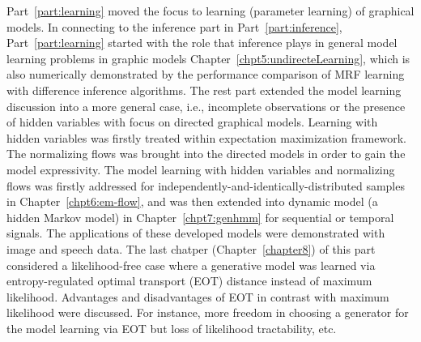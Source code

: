 Part~\ref{part:learning} moved the focus to learning (parameter learning) of graphical models. In connecting to the inference part in Part~\ref{part:inference}, Part~\ref{part:learning} started with the role that inference plays in general model learning problems in graphic models Chapter~\ref{chpt5:undirecteLearning}, which is also numerically demonstrated by the performance comparison of MRF learning with difference inference algorithms. The rest part extended the model learning discussion into a more general case, i.e., incomplete observations or the presence of hidden variables with focus on directed graphical models. Learning with hidden variables was firstly treated within expectation maximization framework. The normalizing flows was brought into the directed models in order to gain the model expressivity. The model learning with hidden variables and normalizing flows was firstly addressed for independently-and-identically-distributed samples in Chapter~\ref{chpt6:em-flow}, and was then extended into dynamic model (a hidden Markov model) in Chapter~\ref{chpt7:genhmm} for sequential or temporal signals. The applications of these developed models were demonstrated with image and speech data. The last chatper (Chapter~\ref{chapter8}) of this part considered a likelihood-free case where a generative model was learned via entropy-regulated optimal transport (EOT) distance instead of maximum likelihood. Advantages and disadvantages of EOT in contrast with maximum likelihood were discussed. For instance, more freedom in choosing a generator for the model learning via EOT but loss of likelihood tractability, etc.


